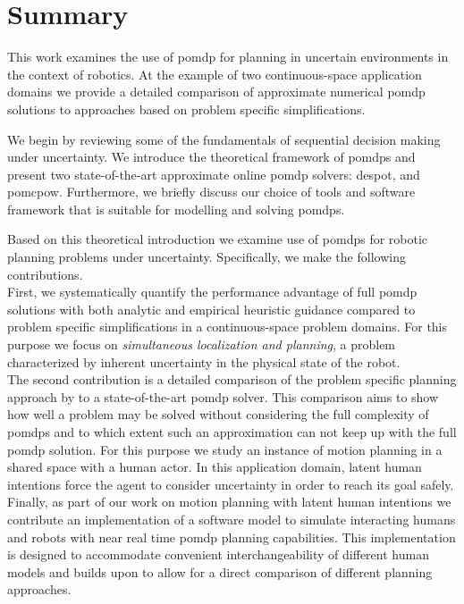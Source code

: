\chapter{Summary}

This work examines the use of \acf{pomdp} for planning in uncertain
environments in the context of robotics. At the example of two continuous-space
application domains we provide a detailed comparison of approximate numerical
\ac{pomdp} solutions to approaches based on problem specific simplifications.

We begin by reviewing some of the fundamentals of sequential decision making
under uncertainty. We introduce the theoretical framework of \acp{pomdp} and
present two state-of-the-art approximate online \ac{pomdp} solvers:
\acf{despot}, and \acf{pomcpow}. Furthermore, we briefly discuss our choice of
tools and software framework that is suitable for modelling and solving
\acp{pomdp}.

Based on this theoretical introduction we examine use of \acp{pomdp} for
robotic planning problems under uncertainty. Specifically, we make the
following contributions.\\
First, we systematically quantify the performance
advantage of full \ac{pomdp} solutions with both analytic and empirical
heuristic guidance compared to problem specific simplifications in a
continuous-space problem domains. For this purpose we focus on
\emph{simultaneous localization and planning}, a problem characterized by
inherent uncertainty in the physical state of the robot.\\
The second contribution is a detailed comparison of the problem specific
planning approach by \cite{fisac2018probabilistically} to a state-of-the-art
\ac{pomdp} solver. This comparison aims to show how well a problem may be
solved without considering the full complexity of \acp{pomdp} and to which
extent such an approximation can not keep up with the full \ac{pomdp} solution.
For this purpose we study an instance of motion planning in a shared space with
a human actor. In this application domain, latent human intentions force the
agent to consider uncertainty in order to reach its goal safely.\\
Finally, as part of our work on motion planning with latent human intentions
we contribute an implementation of a software model to simulate
interacting humans and robots with near real time \ac{pomdp} planning
capabilities. This implementation is designed to accommodate convenient
interchangeability of different human models and builds upon \pomdpsjl to allow
for a direct comparison of different planning approaches.


